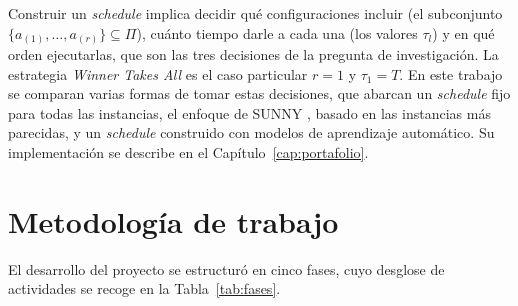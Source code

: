 Construir un \textit{schedule} implica decidir qué configuraciones incluir
(el subconjunto $\{a_{(1)}, \allowbreak \dots, \allowbreak a_{(r)}\} \subseteq \Pi$), cuánto tiempo
darle a cada una (los valores $\tau_l$) y en qué orden ejecutarlas, que son
las tres decisiones de la pregunta de investigación. La estrategia
\textit{Winner Takes All} es el caso particular $r = 1$ y $\tau_1 = T$. En
este trabajo se comparan varias formas de tomar estas decisiones, que abarcan
un \textit{schedule} fijo para todas las instancias, el enfoque de SUNNY
\citep{amadini2014sunny}, basado en las instancias más parecidas, y un
\textit{schedule} construido con modelos de aprendizaje automático. Su
implementación se describe en el Capítulo~\ref{cap:portafolio}.

\section{Metodología de trabajo}
\label{sec:metodologia}

El desarrollo del proyecto se estructuró en cinco fases, cuyo desglose de
actividades se recoge en la Tabla~\ref{tab:fases}.

